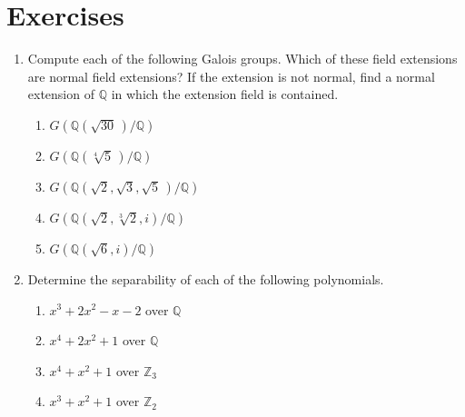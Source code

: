  
 
\section*{Exercises}
\exrule
 
 
{\small
\begin{enumerate}
 
 
\item
Compute each of the following Galois groups. Which of these field
extensions are normal field extensions? If the extension is not
normal, find a normal extension of ${\mathbb Q}$ in which the extension
field is contained.
\begin{multicols}{2}
\begin{enumerate}

\item 
$G({\mathbb Q}(\sqrt{30}\, ) / {\mathbb Q})$

\item 
$G({\mathbb Q}(\sqrt[4]{5}\, ) / {\mathbb Q})$

\item 
$G( {\mathbb Q}(\sqrt{2}, \sqrt{3}, \sqrt{5}\, )/ {\mathbb Q} )$

\item 
$G({\mathbb Q}(\sqrt{2}, \sqrt[3]{2}, i) / {\mathbb Q})$

\item 
$G({\mathbb Q}(\sqrt{6}, i) / {\mathbb Q})$


\end{enumerate}

\end{multicols}
 

 
 
\item
Determine the separability of each of the following polynomials.
\begin{multicols}{2}
\begin{enumerate}

\item 
$x^3 + 2 x^2 - x - 2$ over ${\mathbb Q}$

\item 
$x^4 + 2 x^2 + 1$ over ${\mathbb Q}$

\item 
$x^4 + x^2 + 1$ over ${\mathbb Z}_3$

\item 
$x^3 +x^2 + 1$ over ${\mathbb Z}_2$

\end{enumerate}
\end{multicols}
 


\end{enumerate}}
